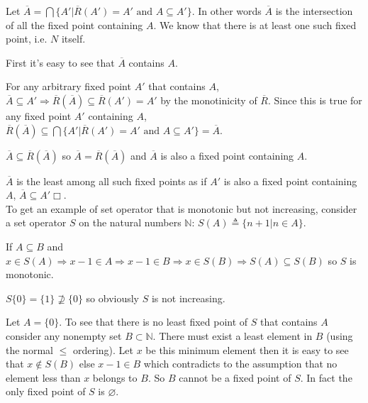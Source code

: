 \documentclass[10pt]{article}
\newcommand{\defined}{\triangleq}
\begin{document}
Let $\overline{A} = \bigcap \{A' | \overline{R} (A') = A' \text{ and } A \subseteq A'\}$. In other words $\overline{A}$ is the intersection of all the fixed point containing $A$. We know that there is at least one such fixed point, i.e. $N$ itself.

First it's easy to see that $\overline{A}$ contains $A$.

For any arbitrary fixed point $A'$ that contains $A$, $\overline{A} \subseteq A'\Rightarrow \overline{R} (\overline{A}) \subseteq \overline R (A') = A'$ by the monotinicity of $\overline R$. Since this is true for any fixed point $A'$ containing $A$,  $\overline{R} (\overline{A}) \subseteq \bigcap \{A' | \overline{R} (A') = A' \text{ and } A \subseteq A'\} = \overline{A}$.

$\overline{A} \subseteq \overline{R} (\overline{A})$ so $\overline{A} = \overline{R} (\overline{A})$ and $\overline{A}$ is also a fixed point containing $A$.

$\overline{A}$ is the least among all such fixed points as if $A'$ is also a fixed point containing $A$, $\overline{A} \subseteq A' \Box$.\\

To get an example of set operator that is monotonic but not increasing, consider a set operator $S$ on the natural numbers $\mathbb{N}$: $S (A)\defined \{n+1 | n \in A\}$.

If $A \subseteq B$ and $x \in S(A) \Rightarrow x-1 \in A \Rightarrow x-1 \in B \Rightarrow x \in S(B) \Rightarrow S(A) \subseteq S(B)$ so $S$ is monotonic.

$S\{0\} = \{1\} \nsupseteq \{0\}$ so obviously $S$ is not increasing.

Let $A = \{0\}$. To see that there is no least fixed point of $S$ that contains $A$ consider any nonempty set $B \subset \mathbb{N}$. There must exist a least element in $B$ (using the normal $\leq$ ordering). Let $x$ be this minimum element then it is easy to see that $x \notin S(B)$ else $x-1 \in B$ which contradicts to the assumption that no element less than $x$ belongs to $B$. So $B$ cannot be a fixed point of $S$. In fact the only fixed point of $S$ is $\varnothing$.
\end{document}
